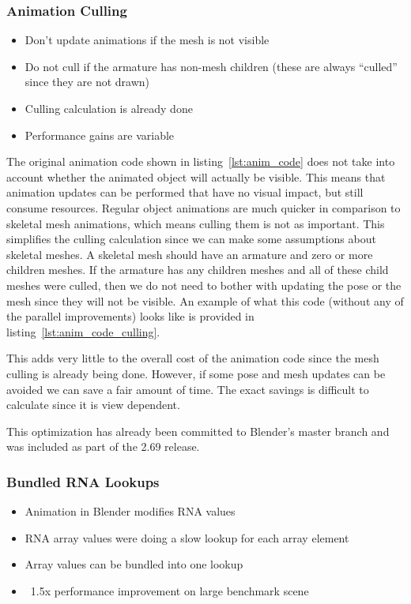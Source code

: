 \subsubsection{Animation Culling}
\ifsummaries
\begin{itemize}
 \item Don't update animations if the mesh is not visible
 \item Do not cull if the armature has non-mesh children (these are always ``culled'' since they are not drawn)
 \item Culling calculation is already done
 \item Performance gains are variable
\end{itemize}
\fi

The original animation code shown in listing~\ref{lst:anim_code} does not take into account whether the animated object will actually be visible.
This means that animation updates can be performed that have no visual impact, but still consume resources.
Regular object animations are much quicker in comparison to skeletal mesh animations, which means culling them is not as important.
This simplifies the culling calculation since we can make some assumptions about skeletal meshes.
A skeletal mesh should have an armature and zero or more children meshes.
If the armature has any children meshes and all of these child meshes were culled, then we do not need to bother with updating the pose or the mesh since they will not be visible.
An example of what this code (without any of the parallel improvements) looks like is provided in listing~\ref{lst:anim_code_culling}.


This adds very little to the overall cost of the animation code since the mesh culling is already being done.
However, if some pose and mesh updates can be avoided we can save a fair amount of time.
The exact savings is difficult to calculate since it is view dependent.

This optimization has already been committed to Blender's master branch and was included as part of the 2.69 release.

\subsubsection{Bundled RNA Lookups}
\ifsummaries
\begin{itemize}
 \item Animation in Blender modifies RNA values
 \item RNA array values were doing a slow lookup for each array element
 \item Array values can be bundled into one lookup
 \item ~1.5x performance improvement on large benchmark scene
\end{itemize}
\fi

